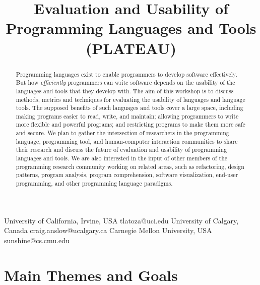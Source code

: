 \documentclass{sigplanconf}
\begin{document}
\title{Evaluation and Usability of Programming Languages and Tools (PLATEAU)}

           {University of California, Irvine, USA}
           {tlatoza@uci.edu} 
           {University of Calgary, Canada}
           {craig.anslow@ucalgary.ca}
           {Carnegie Mellon University, USA}
           {sunshine@cs.cmu.edu}
\date{}

\maketitle
\begin{abstract}

  Programming languages exist to enable programmers to develop
  software effectively.  But how \emph{efficiently} programmers can
  write software depends on the usability of the languages and tools
  that they develop with.  The aim of this workshop is to discuss
  methods, metrics and techniques for evaluating the usability of
  languages and language tools.  The supposed benefits of such
  languages and tools cover a large space, including making programs
  easier to read, write, and maintain; allowing programmers to write
  more flexible and powerful programs; and restricting programs to
  make them more safe and secure. We plan to gather the intersection
  of researchers in the programming language, programming tool, and
  human-computer interaction communities to share their research and
  discuss the future of evaluation and usability of programming
  languages and tools. We are also interested in the input of other
  members of the programming research community working on related
  areas, such as refactoring, design patterns, program analysis,
  program comprehension, software visualization, end-user programming,
  and other programming language paradigms.

\end{abstract}





\section{Main Themes and Goals}
\end{document}
